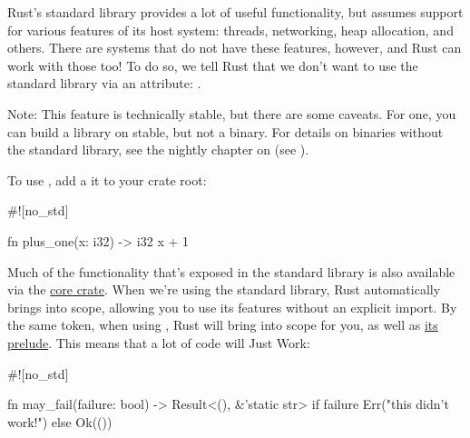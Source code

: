 Rust's standard library provides a lot of useful functionality, but assumes support for various features of its host 
system: threads, networking, heap allocation, and others. There are systems that do not have these features, however, and 
Rust can work with those too! To do so, we tell Rust that we don't want to use the standard library via an attribute: 
\code{\#![no\_std]}.

\begin{myquote}
Note: This feature is technically stable, but there are some caveats. For one, you can build a \code{\#![no\_std]} library 
on stable, but not a binary. For details on binaries without the standard library, see the nightly chapter on 
\code{\#![no\_std]} (see ).
\end{myquote}

To use \code{\#![no\_std]}, add a it to your crate root:

\begin{rustc}
#![no_std]

fn plus_one(x: i32) -> i32 {
    x + 1
}
\end{rustc}

Much of the functionality that's exposed in the standard library is also available via the 
\href{https://doc.rust-lang.org/core/}{core crate}. When we're using the standard library, Rust automatically brings 
 into scope, allowing you to use its features without an explicit import. By the same token, when using 
\code{!\#[no\_std]}, Rust will bring  into scope for you, as well as 
\href{https://doc.rust-lang.org/core/prelude/v1/}{its prelude}. This means that a lot of code will Just Work:

\begin{rustc}
#![no_std]

fn may_fail(failure: bool) -> Result<(), &'static str> {
    if failure {
        Err("this didn't work!")
    } else {
        Ok(())
    }
}
\end{rustc}
